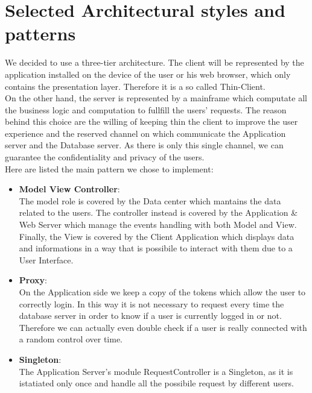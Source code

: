 \documentclass[numbers=noenddot, 12pt, a4paper, oneside]{scrbook}
\begin{document}
\section{Selected Architectural styles and patterns}

We decided to use a three-tier architecture. The client will be represented by the application installed on the device of the user or his web browser, which only contains the presentation layer. Therefore it is a so called Thin-Client.\\

On the other hand, the server is represented by a mainframe which computate all the business logic and computation to fullfill the users' requests. The reason behind this choice are the willing of keeping thin the client to improve the user experience and the reserved channel on which communicate the Application server and the Database server. As there is only this single channel, we can guarantee the confidentiality and privacy of the users. \\

Here are listed the main pattern we chose to implement:
\begin{itemize}
	\item \textbf{Model View Controller}:\\\newline
	The model role is covered by the Data center which mantains the data related to the users. The controller instead is covered by the Application \& Web Server which manage the events handling with both Model and View. Finally, the View is covered by the Client Application which displays data and informations in a way that is possibile to interact with them due to a User Interface.\\
	
	\item \textbf{Proxy}:\\\newline
	On the Application side we keep a copy of the tokens which allow the user to correctly login. In this way it is not necessary to request every time the database server in order to know if a user is currently logged in or not. Therefore we can actually even double check if a user is really connected with a random control over time.\\
	
	\item \textbf{Singleton}:\\\newline
	The Application Server's module RequestController is a Singleton, as it is istatiated only once and handle all the possibile request by different users.\\
		
\end{itemize}
\end{document}
